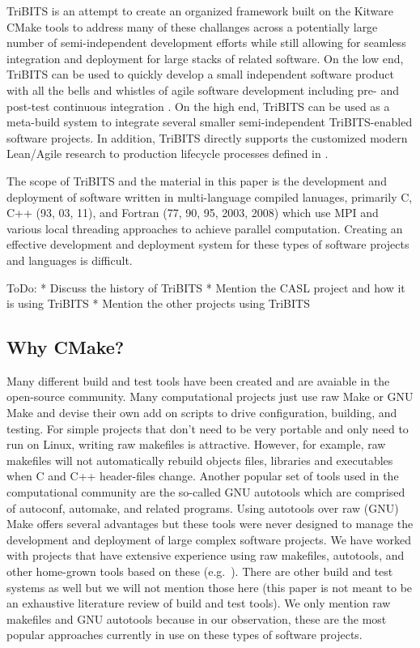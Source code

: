 \documentclass[10pt]{article}
\begin{document}
TriBITS is an attempt to create an organized framework built on the Kitware CMake tools to address many of these challanges across a potentially large number of semi-independent development efforts while still allowing for seamless integration and deployment for large stacks of related software.  On the low end, TriBITS can be used to quickly develop a small independent software product with all the bells and whistles of agile software development including pre- and post-test continuous integration \cite{XP2, ContinuousIntegration07}.  On the high end, TriBITS can be used as a meta-build system to integrate several smaller semi-independent TriBITS-enabled software projects.  In addition, TriBITS directly supports the customized modern Lean/Agile research to production lifecycle processes defined in \cite{TribitsLifecycleModel, TribitsLifecycleModel_eScience2012}.

The scope of TriBITS and the material in this paper is the development and deployment of software written in multi-language compiled lanuages, primarily C, C++ (93, 03, 11), and Fortran (77, 90, 95, 2003, 2008) which use MPI and various local threading approaches to achieve parallel computation.  Creating an effective development and deployment system for these types of software projects and languages is difficult.

ToDo:
* Discuss the history of TriBITS
* Mention the CASL project and how it is using TriBITS
* Mention the other projects using TriBITS

%
\subsection{Why CMake?}
\label{sec:why_cmake}
%

Many different build and test tools have been created and are avaiable in the open-source community.  Many computational projects just use raw Make or GNU Make and devise their own add on scripts to drive configuration, building, and testing.  For simple projects that don't need to be very portable and only need to run on Linux, writing raw makefiles is attractive.  However, for example, raw makefiles will not automatically rebuild objects files, libraries and executables when C and C++ header-files change.  Another popular set of tools used in the computational community are the so-called GNU autotools which are comprised of autoconf, automake, and related programs.  Using autotools over raw (GNU) Make offers several advantages but these tools were never designed to manage the development and deployment of large complex software projects.  We have worked with projects that have extensive experience using raw makefiles, autotools, and other home-grown tools based on these (e.g.\ \cite{Trilinos}).  There are other build and test systems as well but we will not mention those here (this paper is not meant to be an exhaustive literature review of build and test tools).  We only mention raw makefiles and GNU autotools because in our observation, these are the most popular approaches currently in use on these types of software projects.
\end{document}
